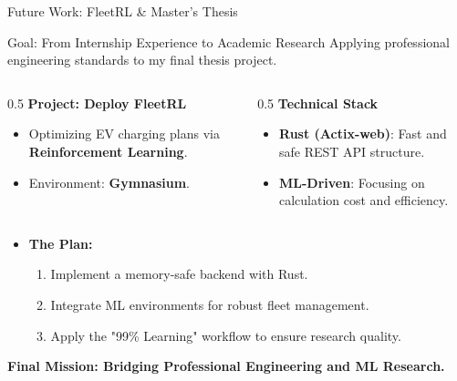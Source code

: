 \documentclass[11pt]{beamer}
\begin{document}
\begin{frame}{Future Work: FleetRL \& Master's Thesis}
    \begin{block}{Goal: From Internship Experience to Academic Research}
        Applying professional engineering standards to my final thesis project.
    \end{block}

    \begin{columns}[t]
        \begin{column}{0.5\textwidth}
            \textbf{Project: Deploy FleetRL}
            \begin{itemize}
                \item Optimizing EV charging plans via \textbf{Reinforcement Learning}.
                \item Environment: \textbf{Gymnasium}.
            \end{itemize}
        \end{column}
        \begin{column}{0.5\textwidth}
            \textbf{Technical Stack}
            \begin{itemize}
                \item \textbf{Rust (Actix-web)}: Fast and safe REST API structure.
                \item \textbf{ML-Driven}: Focusing on calculation cost and efficiency.
            \end{itemize}
        \end{column}
    \end{columns}

    \vspace{0.5cm}
    \begin{itemize}
        \item \textbf{The Plan:}
            \begin{enumerate}
                \item Implement a memory-safe backend with Rust.
                \item Integrate ML environments for robust fleet management.
                \item Apply the "99\% Learning" workflow to ensure research quality.
            \end{enumerate}
    \end{itemize}

    \vfill
    \centering
    \textbf{Final Mission: Bridging Professional Engineering and ML Research.}
\end{frame}
\end{document}
